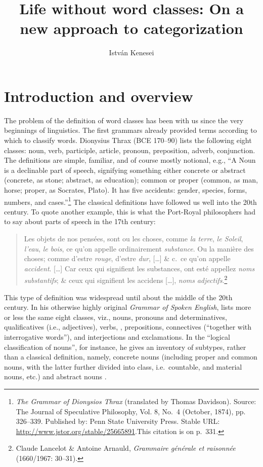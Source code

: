 \documentclass[output=paper]{langsci/langscibook}
\author{István Kenesei\affiliation{Research Institute for Linguistics,
Budapest, \& University of Szeged}}
\title{Life without word classes: On a new approach to categorization}
\begin{document}
\glsresetall

\section{Introduction and overview}\label{sec:27.1}

The problem of the definition of word classes has been with us since the very
beginnings of linguistics. The first grammars already provided terms according
to which to classify words. Dionysius Thrax (BCE 170--90) lists the following
eight classes: noun, verb, participle, article, pronoun, preposition, adverb,
conjunction. The definitions are simple, familiar, and of course mostly
notional, e.g., “A Noun is a declinable part of speech, signifying something
either concrete or abstract (concrete, as stone; abstract, as education);
common or proper (common, as man, horse; proper, as Socrates, Plato). It has
five accidents: gender, species, forms, numbers, and cases.”\footnote{\emph{The
    Grammar of Dionysios Thrax} (translated by Thomas Davidson). Source: The
    Journal of Speculative Philosophy, Vol. 8, No.\ 4 (October, 1874), pp.
    326--339.  Published by: Penn State University Press.  Stable URL\@:
    \url{http://www.jstor.org/stable/25665891}.This citation is on p.\ 331.}
    The classical definitions have followed us well into the 20th century. To
    quote another example, this is what the Port-Royal philosophers had to say
    about parts of speech in the 17th century:

\begin{quote}

Les objets de nos
pensées, sont ou les choses, comme \emph{la terre}, \emph{le Soleil},
\emph{l’eau}, \emph{le bois}, ce qu’on appelle ordinairement
\emph{substance}. Ou la manière des choses; comme d’estre \emph{rouge},
d’estre \emph{dur}, [\dots] \& c.\ ce qu’on appelle \emph{accident}. [\dots] Car
ceux qui signifient les substances, ont esté appellez \emph{noms
    substantifs}; \& ceux qui signifient les accidens [\dots], \emph{noms}
    \emph{adjectifs}.\footnote{Claude Lancelot \& Antoine Arnauld,
    \emph{Grammaire générale et raisonnée} (1660/1967: 30--31).}

\end{quote}

This type of definition was widespread until about the middle of the 20th
century. In his otherwise highly original \emph{Grammar of Spoken English},
\citet{Palmer1924} lists more or less the same eight classes, viz., nouns,
pronouns and determinatives, qualificatives (i.e., adjectives), verbs, ,
prepositions, connectives (“together with interrogative words”), and
interjections and exclamations. In the “logical classification of nouns”, for
instance, he gives an inventory of subtypes, rather than a classical
definition, namely, concrete nouns (including proper and common nouns, with the
latter further divided into class, i.e.\ countable, and material nouns, etc.)
and abstract nouns \citep[28--32]{Palmer1924}.
\end{document}
